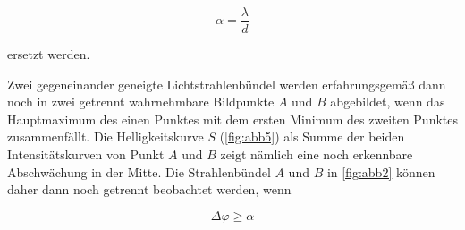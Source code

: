 \documentclass[11pt,ngerman]{scrartcl}
\begin{document}
\begin{equation}
	\alpha = \frac{\lambda}{d}
\end{equation}

ersetzt werden.

Zwei gegeneinander geneigte Lichtstrahlenbündel werden erfahrungsgemäß dann noch in zwei
getrennt wahrnehmbare Bildpunkte $A$ und $B$ abgebildet, wenn das Hauptmaximum des einen
Punktes mit dem ersten Minimum des zweiten Punktes zusammenfällt. Die Helligkeitskurve $S$
(\autoref{fig:abb5}) als Summe der beiden Intensitätskurven von Punkt $A$ und $B$ zeigt nämlich eine noch
erkennbare Abschwächung in der Mitte. Die Strahlenbündel $A$ und $B$ in \autoref{fig:abb2} können daher
dann noch getrennt beobachtet werden, wenn

\begin{equation}
	\Delta \varphi \geq \alpha
\end{equation}
\end{document}

